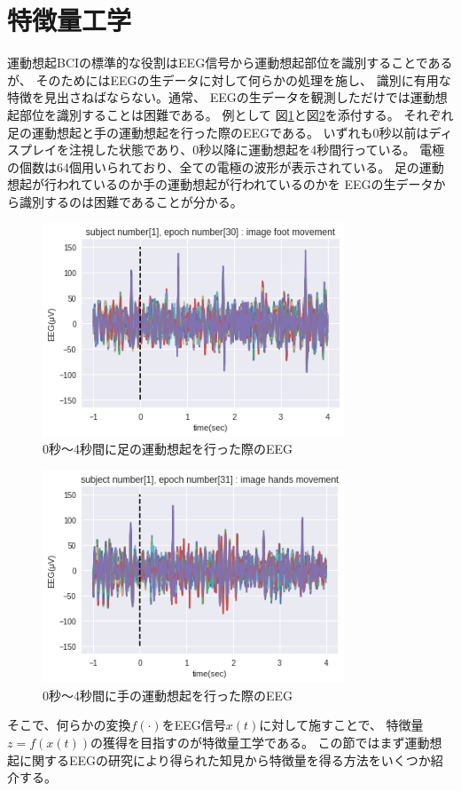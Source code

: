 
\section{\mc 特徴量工学}
運動想起BCIの標準的な役割はEEG信号から運動想起部位を識別することであるが、
そのためにはEEGの生データに対して何らかの処理を施し、
識別に有用な特徴を見出さねばならない。通常、
EEGの生データを観測しただけでは運動想起部位を識別することは困難である。
例として
図\ref{fig:EEGfootmove}と図\ref{fig:EEGhandmove}を添付する。
それぞれ足の運動想起と手の運動想起を行った際のEEGである。
いずれも0秒以前はディスプレイを注視した状態であり、0秒以降に運動想起を4秒間行っている。
電極の個数は64個用いられており、全ての電極の波形が表示されている。
足の運動想起が行われているのか手の運動想起が行われているのかを
EEGの生データから識別するのは困難であることが分かる。
\begin{figure}[t]
    \centering
    \includegraphics[width=9cm]{images/EEGfootmove.png}
    \caption{0秒〜4秒間に足の運動想起を行った際のEEG}
    \label{fig:EEGfootmove}
\end{figure}
\begin{figure}[t]
    \centering
    \includegraphics[width=9cm]{images/EEGhandmove.png}
    \caption{0秒〜4秒間に手の運動想起を行った際のEEG}
    \label{fig:EEGhandmove}
\end{figure}
そこで、何らかの変換\(f(\cdot)\)をEEG信号\(x(t)\)に対して施すことで、
特徴量\(z=f(x(t))\)の獲得を目指すのが特徴量工学である。
この節ではまず運動想起に関するEEGの研究により得られた知見から特徴量を得る方法をいくつか紹介する。

